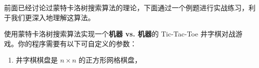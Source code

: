 

前面已经讨论过蒙特卡洛树搜索算法的理论，下面通过一个例题进行实战练习，利于我们更深入地理解这算法。

\begin{example}{}
使用蒙特卡洛树搜索算法实现一个\textbf{机器 vs. 机器}的 Tic-Tac-Toe 井字棋对战游戏。你的程序需要有以下可自定义的参数：
\begin{enumerate}
\item 井字棋棋盘是 $n \times n$ 的正方形网格棋盘，
\end{enumerate}
\end{example}